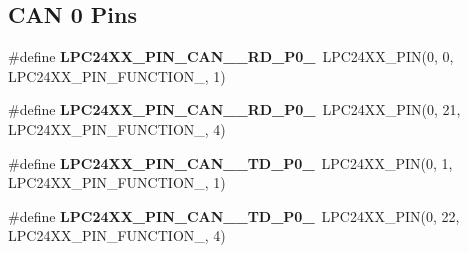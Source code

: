 \subsection*{C\+AN 0 Pins}
\begin{DoxyCompactItemize}
\item 
\mbox{\label{group__lpc24xx__io_ga04b262c88ef7f7a296ce68998f96f4aa}} 
\#define {\bfseries L\+P\+C24\+X\+X\+\_\+\+P\+I\+N\+\_\+\+C\+A\+N\+\_\+\_\+\+R\+D\+\_\+\+P0\+\_}~L\+P\+C24\+X\+X\+\_\+\+P\+IN(0, 0, L\+P\+C24\+X\+X\+\_\+\+P\+I\+N\+\_\+\+F\+U\+N\+C\+T\+I\+O\+N\+\_, 1)
\item 
\mbox{\label{group__lpc24xx__io_gaef66c6b4dccce45d46a78b7bd592b1c5}} 
\#define {\bfseries L\+P\+C24\+X\+X\+\_\+\+P\+I\+N\+\_\+\+C\+A\+N\+\_\+\_\+\+R\+D\+\_\+\+P0\+\_}~L\+P\+C24\+X\+X\+\_\+\+P\+IN(0, 21, L\+P\+C24\+X\+X\+\_\+\+P\+I\+N\+\_\+\+F\+U\+N\+C\+T\+I\+O\+N\+\_, 4)
\item 
\mbox{\label{group__lpc24xx__io_ga0852c4c38e57f850d6a79aa28e098ff9}} 
\#define {\bfseries L\+P\+C24\+X\+X\+\_\+\+P\+I\+N\+\_\+\+C\+A\+N\+\_\+\_\+\+T\+D\+\_\+\+P0\+\_}~L\+P\+C24\+X\+X\+\_\+\+P\+IN(0, 1, L\+P\+C24\+X\+X\+\_\+\+P\+I\+N\+\_\+\+F\+U\+N\+C\+T\+I\+O\+N\+\_, 1)
\item 
\mbox{\label{group__lpc24xx__io_gaa3ae1148ce40d18f9c953d6bb1d788a6}} 
\#define {\bfseries L\+P\+C24\+X\+X\+\_\+\+P\+I\+N\+\_\+\+C\+A\+N\+\_\+\_\+\+T\+D\+\_\+\+P0\+\_}~L\+P\+C24\+X\+X\+\_\+\+P\+IN(0, 22, L\+P\+C24\+X\+X\+\_\+\+P\+I\+N\+\_\+\+F\+U\+N\+C\+T\+I\+O\+N\+\_, 4)
\end{DoxyCompactItemize}
